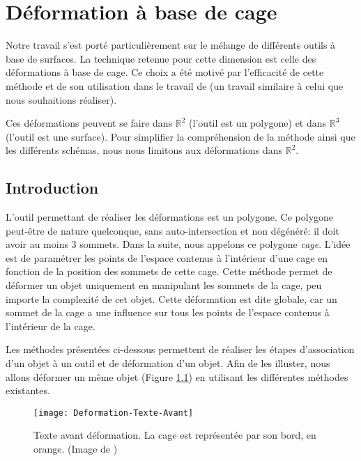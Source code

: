

\chapter{Déformation à base de cage}

\graphicspath{ {Chapter2/Chapter2Figs/PNG/}
  {Chapter2/Chapter2Figs/PDF/} {Chapter2/Chapter2Figs/} }

Notre travail s'est porté particulièrement sur le mélange de différents outils
à base de surfaces. La technique retenue pour cette dimension est celle des
déformations à base de cage. Ce choix a été motivé par l'efficacité de cette
méthode et de son utilisation dans le travail de \cite{GPCP13} (un travail
similaire à celui que nous souhaitions réaliser).

Ces déformations peuvent se faire dans $\mathbb{R}^2$ (l'outil est un
polygone) et dans $\mathbb{R}^3$ (l'outil est une surface). Pour simplifier la
compréhension de la méthode ainsi que les différents schémas, nous nous
limitons aux déformations dans $\mathbb{R}^2$.

\section{Introduction} 

L'outil permettant de réaliser les déformations est un polygone. Ce polygone
peut-être de nature quelconque, sans auto-intersection et non dégénéré: il
doit avoir au moins 3 sommets. Dans la suite, nous appelons ce polygone
\textit{cage}. L'idée est de paramétrer les points de l'espace contenus à
l'intérieur d'une cage en fonction de la position des sommets de cette cage.
Cette méthode permet de déformer un objet uniquement en manipulant les sommets
de la cage, peu importe la complexité de cet objet. Cette déformation est dite
globale, car un sommet de la cage a une influence sur tous les points de
l'espace contenus à l'intérieur de la cage.

Les méthodes présentées ci-dessous permettent de réaliser les étapes
d'association d'un objet à un outil et de déformation d'un objet. Afin de les
illuster, nous allons déformer un même objet (Figure \ref{DEFAva}) en
utilisant les différentes méthodes existantes.

\begin{figure}[!ht]
\texttt{[image: Deformation-Texte-Avant]}

\caption[Texte avant déformation] {Texte avant déformation. La cage est
représentée par son bord, en orange. (Image de \cite{LLC08})}

\label{DEFAva}
\end{figure}

